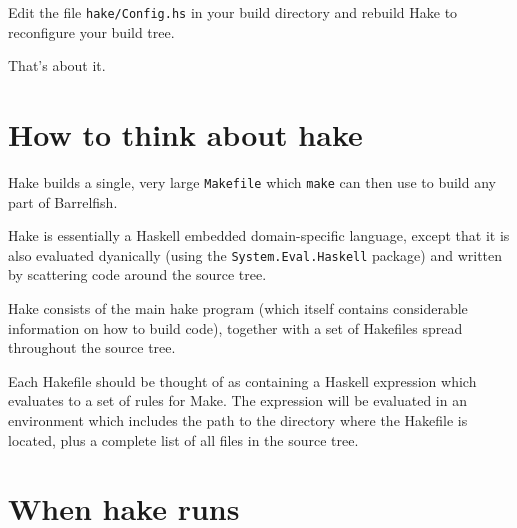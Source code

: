 \documentclass[a4paper,twoside]{report} %
\begin{document}
Edit the file \texttt{hake/Config.hs} in your build directory and
rebuild Hake to reconfigure your build tree. 

That's about it. 

\section{How to think about hake}

Hake builds a single, very large \texttt{Makefile} which
\texttt{make} can then use to build any part of Barrelfish. 

Hake is essentially a Haskell embedded domain-specific language,
except that it is also evaluated dyanically (using the
\texttt{System.Eval.Haskell} package) and written by scattering code
around the source tree. 

Hake consists of the main hake program (which itself contains
considerable information on how to build code), together with a set of
Hakefiles spread throughout the source tree.  

Each Hakefile should be thought of as containing a Haskell expression
which evaluates to a set of rules for Make.  The expression will be 
evaluated in an environment which includes the path to the directory
where the Hakefile is located, plus a complete list of all files in
the source tree. 

\section{When hake runs}
\end{document}
